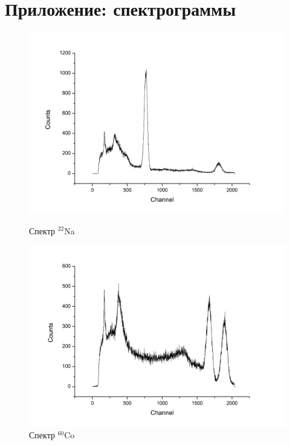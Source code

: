 \documentclass[a4paper]{article}
\begin{document}
\section{Приложение: спектрограммы}

\begin{figure}[ht]
\begin{center}
\begin{minipage}[h]{0.48\linewidth}
\includegraphics[width=1\linewidth]{image/Na.png}
\caption{Спектр $^{22}$Na} %
\end{minipage}
\hfill 
\begin{minipage}[ht]{0.48\linewidth}
\includegraphics[width=1\linewidth]{image/Co.png}
\caption{Спектр $^{60}$Co}
\end{minipage}
\end{center}
\end{figure}
\end{document}
